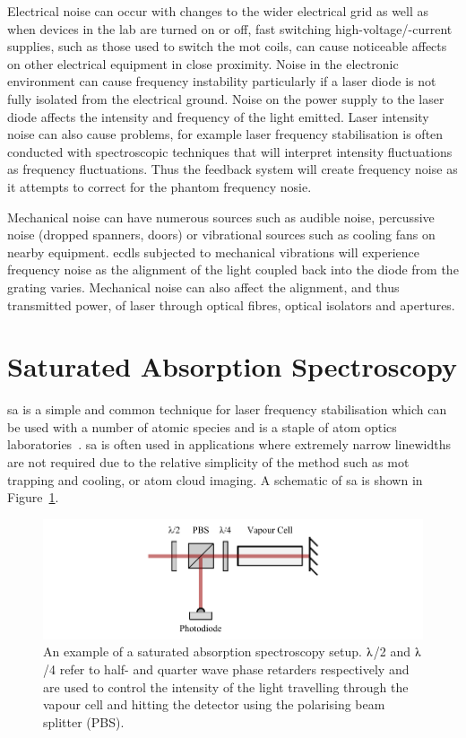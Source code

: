 Electrical noise can occur with changes to the wider electrical grid as well as when devices in the lab are turned on or off, fast switching high-voltage/-current supplies, such as those used to switch the \gls{mot} coils, can cause noticeable affects on other electrical equipment in close proximity.
Noise in the electronic environment can cause frequency instability particularly if a laser diode is not fully isolated from the electrical ground. Noise on the power supply to the laser diode affects the intensity and frequency of the light emitted.
Laser intensity noise can also cause problems, for example laser frequency stabilisation is often conducted with spectroscopic techniques that will interpret intensity fluctuations as frequency fluctuations. Thus the feedback system will create frequency noise as it attempts to correct for the phantom frequency nosie.

Mechanical noise can have numerous sources such as audible noise, percussive noise (dropped spanners, doors) or vibrational sources such as cooling fans on nearby equipment.
\Glspl{ecdl} subjected to mechanical vibrations will experience frequency noise as the alignment of the light coupled back into the diode from the grating varies.
Mechanical noise can also affect the alignment, and thus transmitted power, of laser through optical fibres, optical isolators and apertures.

\section{Saturated Absorption Spectroscopy}
\Gls{sa} is a simple and common technique for laser frequency stabilisation which can be used with a number of atomic species and is a staple of atom optics laboratories~\cite{demtroder_laser_2003}.
\Gls{sa} is often used in applications where extremely narrow linewidths are not required due to the relative simplicity of the method such as \gls{mot} trapping and cooling, or atom cloud imaging.
A schematic of \gls{sa} is shown in Figure~\ref{figure:satabs}.

\begin{figure}
\center
\includegraphics{part1/Figs/SatAbs.pdf}
\caption{An example of a saturated absorption spectroscopy setup. $\lambdaup$/2 and $\lambdaup$/4 refer to half- and quarter wave phase retarders respectively and are used to control the intensity of the light travelling through the vapour cell and hitting the detector using the polarising beam splitter (PBS).}
\label{figure:satabs}
\end{figure}

